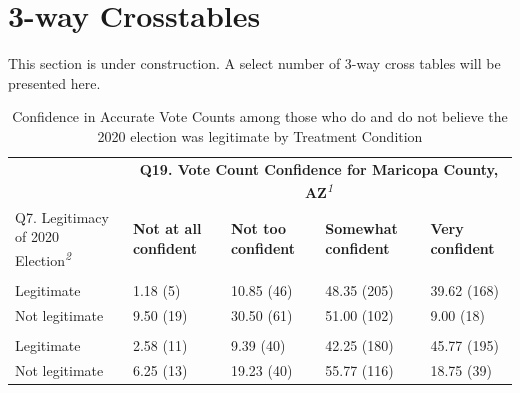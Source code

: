 \documentclass[
  11pt,
  a4paper,
]{article}
\begin{document}
\section{3-way Crosstables}\label{way-crosstables}

\begin{tcolorbox}[enhanced jigsaw, leftrule=.75mm, title=\textcolor{quarto-callout-note-color}{\faInfo}\hspace{0.5em}{Note}, bottomrule=.15mm, breakable, colback=white, rightrule=.15mm, colframe=quarto-callout-note-color-frame, titlerule=0mm, opacityback=0, opacitybacktitle=0.6, coltitle=black, left=2mm, bottomtitle=1mm, colbacktitle=quarto-callout-note-color!10!white, toptitle=1mm, arc=.35mm, toprule=.15mm]

This section is under construction. A select number of 3-way cross
tables will be presented here.

\end{tcolorbox}

\begingroup
\setlength{\LTpost}{0mm}

\begin{longtable}{lllll}

\caption{\label{tbl-q19q7}Confidence in Accurate Vote Counts among those
who do and do not believe the 2020 election was legitimate by Treatment
Condition}

\tabularnewline

\toprule
 & \multicolumn{4}{c}{{\bfseries Q19. Vote Count Confidence for Maricopa County, AZ}\textsuperscript{\textit{1}}} \\ 
\cmidrule(lr){2-5}
Q7. Legitimacy of 2020 Election\textsuperscript{\textit{2}} & {\bfseries Not at all confident} & {\bfseries Not too confident} & {\bfseries Somewhat confident} & {\bfseries Very confident} \\ 
\midrule\addlinespace[2.5pt]
\multicolumn{5}{l}{{\bfseries Control}} \\[2.5pt] 
\midrule\addlinespace[2.5pt]
Legitimate & 1.18  (5) & 10.85 (46) & 48.35 (205) & 39.62 (168) \\ 
Not legitimate & 9.50 (19) & 30.50 (61) & 51.00 (102) & 9.00  (18) \\ 
\midrule\addlinespace[2.5pt]
\multicolumn{5}{l}{{\bfseries Treatment}} \\[2.5pt] 
\midrule\addlinespace[2.5pt]
Legitimate & 2.58 (11) & 9.39 (40) & 42.25 (180) & 45.77 (195) \\ 
Not legitimate & 6.25 (13) & 19.23 (40) & 55.77 (116) & 18.75  (39) \\ 
\bottomrule

\end{longtable}
\end{document}
